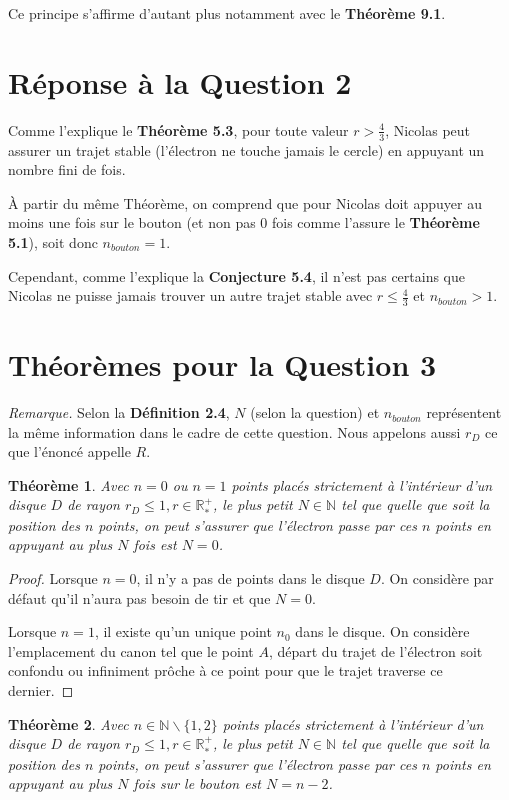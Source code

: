 \documentclass[a4paper]{amsart}
\newtheorem{theorem}{Théorème}[section]
\theoremstyle{definition}
\theoremstyle{remark}
\numberwithin{equation}{section}
\begin{document}
Ce principe s'affirme d'autant plus notamment avec le \textbf{Théorème 9.1}.

\section{Réponse à la Question 2}

Comme l'explique le \textbf{Théorème 5.3}, pour toute valeur $r>\frac{4}{3}$, Nicolas peut assurer un trajet stable (l'électron ne touche jamais le cercle) en appuyant un nombre fini de fois.

À partir du même Théorème, on comprend que pour Nicolas doit appuyer au moins une fois sur le bouton (et non pas 0 fois comme l'assure le \textbf{Théorème 5.1}), soit donc $n_{bouton}=1$.

Cependant, comme l'explique la \textbf{Conjecture 5.4}, il n'est pas certains que Nicolas ne puisse jamais trouver un autre trajet stable avec $r\leq\frac{4}{3}$ et $n_{bouton}>1$.

\section{Théorèmes pour la Question 3}

\textit{Remarque.} Selon la \textbf{Définition 2.4}, $N$ (selon la question) et $n_{bouton}$ représentent la même information dans le cadre de cette question. Nous appelons aussi $r_D$ ce que l'énoncé appelle $R$.
\begin{theorem}
  Avec $n=0 $ ou $n=1$ points placés strictement à l'intérieur d'un disque $D$ de rayon $r_D\leq1,r\in\mathbb{R^+_*}$, le plus petit $N\in\mathbb{N}$ tel que quelle que soit la
  position des $n$ points, on peut s’assurer que l’électron passe par ces $n$ points en appuyant au plus $N$ fois est $N=0$.
\end{theorem}

\begin{proof}
  Lorsque $n=0$, il n'y a pas de points dans le disque $D$. On considère par défaut qu'il n'aura pas besoin de tir et que $N=0$.

  Lorsque $n=1$, il existe qu'un unique point $n_0$ dans le disque. On considère l'emplacement du canon tel que le point $A$, départ du trajet de l'électron soit confondu ou infiniment prôche à ce point pour que le trajet traverse ce dernier.
\end{proof}

\begin{theorem}
  Avec $n\in\mathbb{N}\backslash\lbrace{1,2}\rbrace$ points placés strictement à l'intérieur d'un disque $D$ de rayon $r_D\leq1, r\in\mathbb{R^+_*}$, le plus petit $N\in\mathbb{N}$ tel que quelle que soit la
  position des $n$ points, on peut s’assurer que l’électron passe par ces $n$ points en appuyant au plus $N$ fois sur le bouton est $N=n-2$.
\end{theorem}
\end{document}
